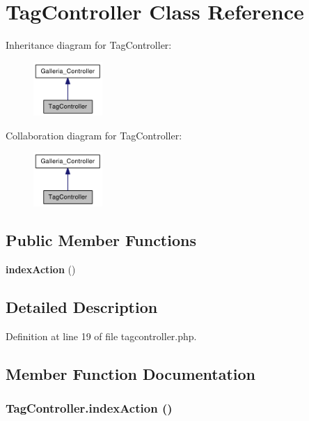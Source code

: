\section{TagController Class Reference}
\label{classTagController}
Inheritance diagram for TagController:\nopagebreak
\begin{figure}[H]
\begin{center}
\leavevmode
\includegraphics[width=74pt]{classTagController__inherit__graph}
\end{center}
\end{figure}
Collaboration diagram for TagController:\nopagebreak
\begin{figure}[H]
\begin{center}
\leavevmode
\includegraphics[width=74pt]{classTagController__coll__graph}
\end{center}
\end{figure}
\subsection*{Public Member Functions}
\begin{CompactItemize}
\item 
{\bf indexAction} ()
\end{CompactItemize}


\subsection{Detailed Description}


Definition at line 19 of file tagcontroller.php.

\subsection{Member Function Documentation}
\subsubsection{\setlength{\rightskip}{0pt plus 5cm}TagController.indexAction ()}\label{classTagController_3fc537f4d4a5b09ee8608a508151d6cc}


